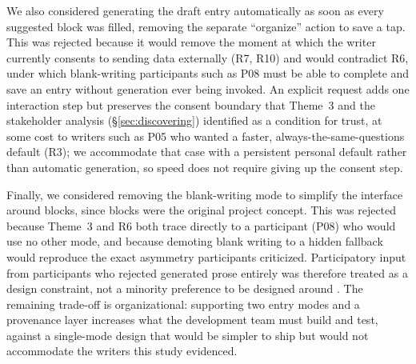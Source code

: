 \documentclass[sigconf,nonacm]{acmart}
\begin{document}
We also considered generating the draft entry automatically as soon as every
suggested block was filled, removing the separate ``organize'' action to save
a tap. This was rejected because it would remove the moment at which the
writer currently consents to sending data externally (R7, R10) and would
contradict R6, under which blank-writing participants such as P08 must be able
to complete and save an entry without generation ever being invoked. An
explicit request adds one interaction step but preserves the consent boundary
that Theme~3 and the stakeholder analysis (\S\ref{sec:discovering}) identified
as a condition for trust, at some cost to writers such as P05 who wanted a
faster, always-the-same-questions default (R3); we accommodate that case with
a persistent personal default rather than automatic generation, so speed does
not require giving up the consent step.

Finally, we considered removing the blank-writing mode to simplify the
interface around blocks, since blocks were the original project concept. This
was rejected because Theme~3 and R6 both trace directly to a participant (P08)
who would use no other mode, and because demoting blank writing to a hidden
fallback would reproduce the exact asymmetry participants criticized.
Participatory input from participants who rejected generated prose entirely
was therefore treated as a design constraint, not a minority preference to be
designed around \cite{muller1993participatory}. The remaining trade-off is
organizational: supporting two entry modes and a provenance layer increases
what the development team must build and test, against a single-mode design
that would be simpler to ship but would not accommodate the writers this study
evidenced.
\end{document}

